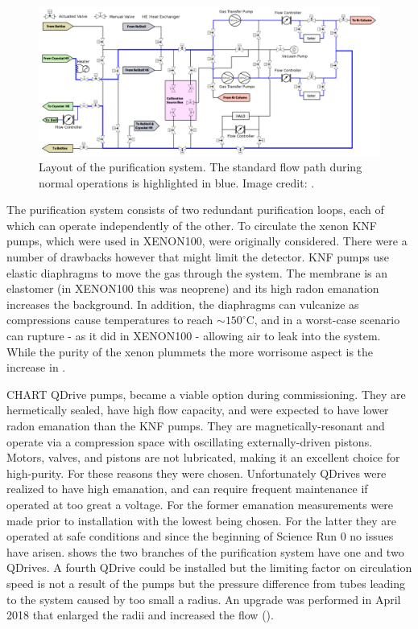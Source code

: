 \begin{figure}
\centering
\includegraphics[width=\textwidth]{PurificationLayout}
\caption{Layout of the purification system.  The standard flow path during normal operations is highlighted in blue.  Image credit:
.}
\label{fig:xenon1t_pur_schematic}
\end{figure}

The purification system consists of two redundant purification loops, each of which can operate independently of the other.  To circulate
the xenon KNF pumps, which were used in XENON100, were originally considered.  There were a number of drawbacks however that might limit
the detector.  KNF pumps use elastic diaphragms to move the gas through the system.  The membrane is an elastomer (in XENON100 this was
neoprene) and its high radon emanation increases the background.  In addition, the diaphragms can vulcanize as compressions cause
temperatures to reach ${\sim} 150^{\circ}\mathrm{C}$, and in a worst-case scenario can rupture - as it did in XENON100 - allowing air to
leak into the system.  While the purity of the xenon plummets the more worrisome aspect is the increase in .

CHART QDrive pumps, became a viable option during commissioning.  They are hermetically sealed, have high flow capacity, and were expected
to have lower radon emanation than the KNF pumps.  They are
magnetically-resonant and operate via a compression space with oscillating externally-driven pistons.  Motors, valves, and pistons are
not lubricated, making it an excellent choice for high-purity.  For these reasons they were chosen.  Unfortunately QDrives were realized
to have high  emanation, and can require frequent
maintenance if operated at too great a voltage.  For the former  emanation measurements were made prior to
installation with the lowest being chosen.  For the latter they are operated at safe conditions and since the beginning of Science Run 0
no issues have arisen.   shows the two branches of the purification system have one and two QDrives.  A
fourth QDrive could be installed but the limiting factor on circulation speed is not a result of the pumps but the pressure difference
from tubes leading to the system caused by too small a radius.  An upgrade was performed in April 2018 that enlarged the radii and
increased the flow ().

